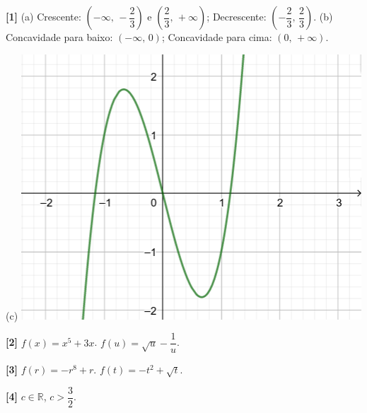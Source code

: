 \documentclass[12pt,a4paper]{article}
\begin{document}
\textbf{[1]} 
(a) Crescente: $\left(-\infty,\, -\dfrac{2}{3}\right)$ e $\left(\dfrac{2}{3},\,+\infty\right)$; 
Decrescente: $\left(-\dfrac{2}{3},\, \dfrac{2}{3}\right)$. 
(b) Concavidade para baixo: $\left(-\infty,\, 0\right)$; Concavidade para cima: $\left(0,\, +\infty\right)$. 

(c) \includegraphics[scale=1]{imagem/grafico-lista-iii-2021.2.png} 

\textbf{[2]} $f(x) = x^5 + 3x$. $f(u) = \sqrt{u} - \dfrac{1}{u}$. 

\textbf{[3]} $f(r) = -r^8 + r$. $f(t) = -t^2 + \sqrt{t}$. 

\textbf{[4]} $c\in \mathbb{R}$, $c > \dfrac{3}{2}$.
\end{document}
